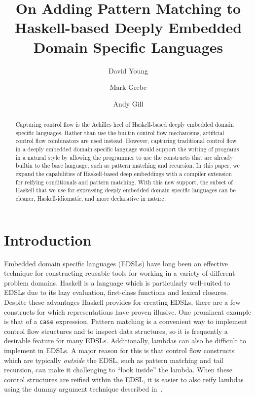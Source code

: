 \documentclass[runningheads, a4paper]{llncs}
\newcommand{\ttt}{\texttt}
\begin{document}
\title{On Adding Pattern Matching to Haskell-based
  Deeply Embedded Domain Specific Languages}


\author{David Young \and Mark Grebe \and Andy Gill}



\maketitle

\begin{abstract}
  Capturing control flow is the Achilles heel of Haskell-based
  deeply embedded domain specific languages.
  Rather than use
  the builtin control flow mechanisms, artificial control flow combinators
  are used instead.
  However, capturing traditional control flow in a deeply embedded domain specific language
  would support the writing of programs in a natural style by allowing the programmer to use the
  constructs that are already builtin to the base language, such as pattern
  matching and recursion.
  In this paper, we expand the capabilities of
  Haskell-based deep embeddings with a compiler extension
  for reifying conditionals and pattern matching.
  With this new support, the subset of Haskell that we use for expressing
  deeply embedded domain specific languages can be cleaner, Haskell-idiomatic,
  and more declarative in nature.

\end{abstract}

\section{Introduction}

Embedded domain specific languages (EDSLs) have long been an effective
technique for constructing reusable tools for working in a variety of
different problem domains. Haskell is a language which is particularly
well-suited to EDSLs due to its lazy evaluation, first-class functions and
lexical closures.
%
Despite these advantages Haskell provides for creating EDSLs, there are a few
constructs for which representations have proven illusive. One prominent example
is that of a \ttt{case} expression. Pattern matching is a convenient way to
implement control flow structures and to inspect data structures, so it is
frequently a desirable feature for many EDSLs.
%
Additionally, lambdas can also be difficult to implement in EDSLs. A major reason
for this is that control flow constructs which are typically \textit{outside} the EDSL,
such as pattern matching and tail recursion, can make it challenging to ``look inside''
the lambda. When these control structures are reified within the EDSL, it is
easier to also reify lambdas using the dummy argument technique described in~\cite{Elliott:03:CompileDSEL-JFP}.
\end{document}
